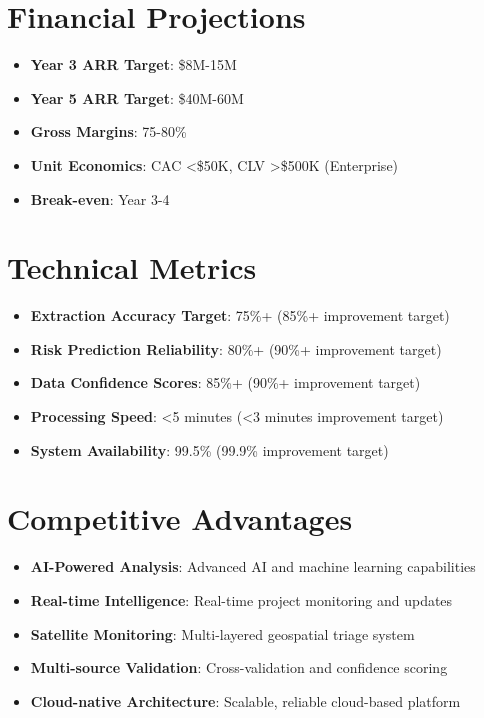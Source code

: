 \documentclass[11pt,a4paper]{book}
\begin{document}
\section{Financial Projections}
\begin{itemize}
    \item \textbf{Year 3 ARR Target}: \$8M-15M
    \item \textbf{Year 5 ARR Target}: \$40M-60M
    \item \textbf{Gross Margins}: 75-80\%
    \item \textbf{Unit Economics}: CAC <\$50K, CLV >\$500K (Enterprise)
    \item \textbf{Break-even}: Year 3-4
\end{itemize}

\section{Technical Metrics}
\begin{itemize}
    \item \textbf{Extraction Accuracy Target}: 75\%+ (85\%+ improvement target)
    \item \textbf{Risk Prediction Reliability}: 80\%+ (90\%+ improvement target)
    \item \textbf{Data Confidence Scores}: 85\%+ (90\%+ improvement target)
    \item \textbf{Processing Speed}: <5 minutes (<3 minutes improvement target)
    \item \textbf{System Availability}: 99.5\% (99.9\% improvement target)
\end{itemize}

\section{Competitive Advantages}
\begin{itemize}
    \item \textbf{AI-Powered Analysis}: Advanced AI and machine learning capabilities
    \item \textbf{Real-time Intelligence}: Real-time project monitoring and updates
    \item \textbf{Satellite Monitoring}: Multi-layered geospatial triage system
    \item \textbf{Multi-source Validation}: Cross-validation and confidence scoring
    \item \textbf{Cloud-native Architecture}: Scalable, reliable cloud-based platform
\end{itemize}
\end{document}
